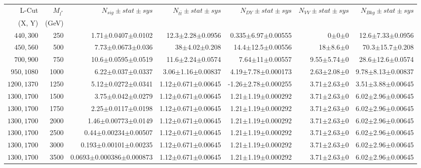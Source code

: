\documentclass[]{article}
\begin{document}
\begin{table}
\begin{center}
\scriptsize{
\begin{tabular}{ |r|r|r|r|r|r|r|}
\hline 
L-Cut & $M_{l^*}$ & $N_{sig}\pm stat \pm sys $ &$N_{t\bar{t}}\pm stat \pm sys $ & $N_{DY}\pm stat \pm sys $ & $N_{VV}\pm stat \pm sys $ &$N_{Bkg}\pm stat \pm sys$\\
(X, Y) & (GeV) & && &&\\
\hline 
$440, 300$ & 250 & 1.71$\pm$0.0407$\pm$0.0102 & 12.3$\pm$2.28$\pm$0.0956 & 0.335$\pm$6.97$\pm$0.00555 & 0$\pm$0$\pm$0 & 12.6$\pm$7.33$\pm$0.0956 \\
$450, 560$ & 500 & 7.73$\pm$0.0673$\pm$0.036 & 38$\pm$4.02$\pm$0.208 & 14.4$\pm$12.5$\pm$0.00556 & 18$\pm$8.6$\pm$0 & 70.3$\pm$15.7$\pm$0.208 \\
$700, 900$ & 750 & 10.6$\pm$0.0595$\pm$0.0519 & 11.6$\pm$2.24$\pm$0.0574 & 7.64$\pm$11$\pm$0.00557 & 9.55$\pm$5.74$\pm$0 & 28.6$\pm$12.6$\pm$0.0574 \\
$950, 1080$ & 1000 & 6.22$\pm$0.037$\pm$0.0337 & 3.06$\pm$1.16$\pm$0.00837 & 4.19$\pm$7.78$\pm$0.000173 & 2.63$\pm$2.08$\pm$0 & 9.78$\pm$8.13$\pm$0.00837 \\
$1200, 1370$ & 1250 & 5.12$\pm$0.0272$\pm$0.0341 & 1.12$\pm$0.671$\pm$0.00645 & -1.26$\pm$2.78$\pm$0.000255 & 3.71$\pm$2.63$\pm$0 & 3.51$\pm$3.88$\pm$0.00645 \\
$1300, 1700$ & 1500 & 3.75$\pm$0.042$\pm$0.0279 & 1.12$\pm$0.671$\pm$0.00645 & 1.21$\pm$1.19$\pm$0.000292 & 3.71$\pm$2.63$\pm$0 & 6.02$\pm$2.96$\pm$0.00645 \\
$1300, 1700$ & 1750 & 2.25$\pm$0.0117$\pm$0.0198 & 1.12$\pm$0.671$\pm$0.00645 & 1.21$\pm$1.19$\pm$0.000292 & 3.71$\pm$2.63$\pm$0 & 6.02$\pm$2.96$\pm$0.00645 \\
$1300, 1700$ & 2000 & 1.46$\pm$0.00773$\pm$0.0149 & 1.12$\pm$0.671$\pm$0.00645 & 1.21$\pm$1.19$\pm$0.000292 & 3.71$\pm$2.63$\pm$0 & 6.02$\pm$2.96$\pm$0.00645 \\
$1300, 1700$ & 2500 & 0.44$\pm$0.00234$\pm$0.00507 & 1.12$\pm$0.671$\pm$0.00645 & 1.21$\pm$1.19$\pm$0.000292 & 3.71$\pm$2.63$\pm$0 & 6.02$\pm$2.96$\pm$0.00645 \\
$1300, 1700$ & 3000 & 0.193$\pm$0.00101$\pm$0.00235 & 1.12$\pm$0.671$\pm$0.00645 & 1.21$\pm$1.19$\pm$0.000292 & 3.71$\pm$2.63$\pm$0 & 6.02$\pm$2.96$\pm$0.00645 \\
$1300, 1700$ & 3500 & 0.0693$\pm$0.000386$\pm$0.000873 & 1.12$\pm$0.671$\pm$0.00645 & 1.21$\pm$1.19$\pm$0.000292 & 3.71$\pm$2.63$\pm$0 & 6.02$\pm$2.96$\pm$0.00645 \\

\end{tabular}}
\end{center}
\end{table}
\end{document}
